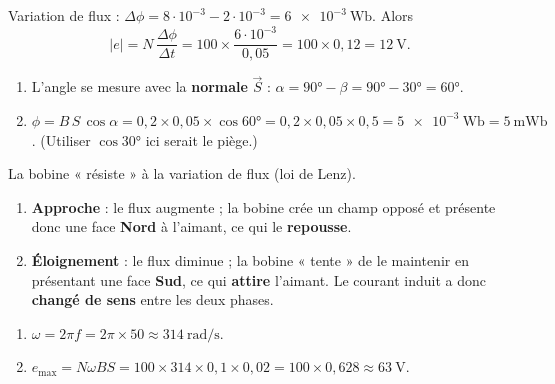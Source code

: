 \documentclass[11pt,a4paper]{article}
\newcommand{\vv}[1]{\vec{#1}}\newcommand{\ds}{\displaystyle}
\begin{document}
\begin{corrige}
Variation de flux : $\Delta\phi=8\cdot10^{-3}-2\cdot10^{-3}=\qty{6e-3}{\weber}$. Alors
\[ |e|=N\,\frac{\Delta\phi}{\Delta t}=100\times\frac{6\cdot10^{-3}}{0{,}05}=100\times0{,}12=\qty{12}{\volt}. \]
\end{corrige}

\begin{corrige}
\begin{enumerate}[label=\alph*)]
  \item L'angle se mesure avec la \textbf{normale} $\vv{S}$ : $\alpha=\ang{90}-\beta=\ang{90}-\ang{30}=\ang{60}$.
  \item $\phi=B\,S\,\cos\alpha=0{,}2\times0{,}05\times\cos\ang{60}=0{,}2\times0{,}05\times0{,}5=\qty{5e-3}{\weber}=\qty{5}{\milli\weber}$.
        (Utiliser $\cos\ang{30}$ ici serait le piège.)
\end{enumerate}
\end{corrige}

\begin{corrige}
La bobine « résiste » à la variation de flux (loi de Lenz).
\begin{enumerate}[label=\alph*)]
  \item \textbf{Approche} : le flux augmente ; la bobine crée un champ opposé et présente donc une
        face \textbf{Nord} à l'aimant, ce qui le \textbf{repousse}.
  \item \textbf{Éloignement} : le flux diminue ; la bobine « tente » de le maintenir en présentant une
        face \textbf{Sud}, ce qui \textbf{attire} l'aimant. Le courant induit a donc \textbf{changé de
        sens} entre les deux phases.
\end{enumerate}
\end{corrige}

\begin{corrige}
\begin{enumerate}[label=\alph*)]
  \item $\omega=2\pi f=2\pi\times50\approx\qty{314}{\radian\per\second}$.
  \item $e_{\max}=N\omega BS=100\times314\times0{,}1\times0{,}02=100\times0{,}628\approx\qty{63}{\volt}$.
\end{enumerate}
\end{corrige}
\end{document}
